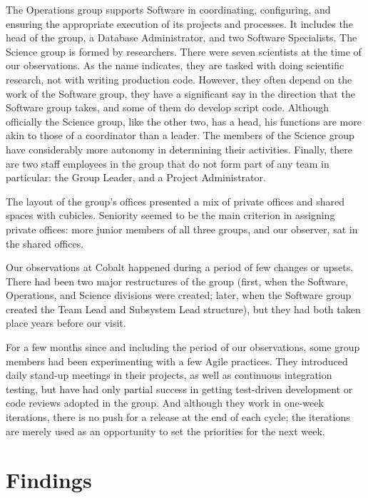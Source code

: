 \documentclass[10pt, conference, compsocconf]{IEEEtran}
\begin{document}
The Operations group supports Software in coordinating, configuring, and ensuring the appropriate execution of its projects and processes. It includes the head of the group, a Database Administrator, and two Software Specialists. The Science group is formed by researchers. There were seven scientists at the time of our observations. As the name indicates, they are tasked with doing scientific research, not with writing production code. However, they often depend on the work of the Software group, they have a significant say in the direction that the Software group takes, and some of them do develop script code. Although officially the Science group, like the other two, has a head, his functions are more akin to those of a coordinator than a leader. The members of the Science group have considerably more autonomy in determining their activities. Finally, there are two staff employees in the group that do not form part of any team in particular: the Group Leader, and a Project Administrator.

The layout of the group's offices presented a mix of private offices and shared spaces with cubicles. Seniority seemed to be the main criterion in assigning private offices: more junior members of all three groups, and our observer, sat in the shared offices.

Our observations at Cobalt happened during a period of few changes or upsets. There had been two major restructures of the group (first, when the Software, Operations, and Science divisions were created; later, when the Software group created the Team Lead and Subsystem Lead structure), but they had both taken place years before our visit.

For a few months since and including the period of our observations, some group members had been experimenting with a few Agile practices. They introduced daily stand-up meetings in their projects, as well as continuous integration testing, but have had only partial success in getting test-driven development or code reviews adopted in the group. And although they work in one-week iterations, there is no push for a release at the end of each cycle; the iterations are merely used as an opportunity to set the priorities for the next week.




\section{Findings}
\end{document}
